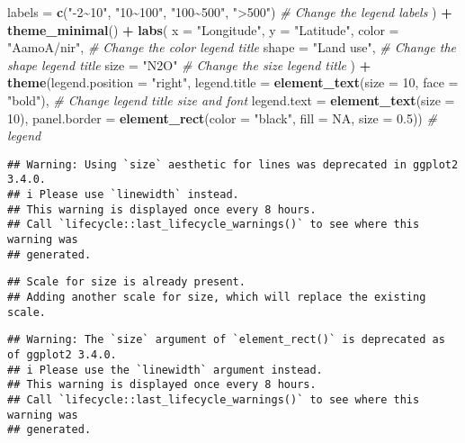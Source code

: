 \documentclass[
]{article}
\newenvironment{Shaded}{\begin{snugshade}}{\end{snugshade}}
\newcommand{\AttributeTok}[1]{\textcolor[rgb]{0.13,0.29,0.53}{#1}}
\newcommand{\CommentTok}[1]{\textcolor[rgb]{0.56,0.35,0.01}{\textit{#1}}}
\newcommand{\ConstantTok}[1]{\textcolor[rgb]{0.56,0.35,0.01}{#1}}
\newcommand{\DecValTok}[1]{\textcolor[rgb]{0.00,0.00,0.81}{#1}}
\newcommand{\FloatTok}[1]{\textcolor[rgb]{0.00,0.00,0.81}{#1}}
\newcommand{\FunctionTok}[1]{\textcolor[rgb]{0.13,0.29,0.53}{\textbf{#1}}}
\newcommand{\NormalTok}[1]{#1}
\newcommand{\SpecialCharTok}[1]{\textcolor[rgb]{0.81,0.36,0.00}{\textbf{#1}}}
\newcommand{\StringTok}[1]{\textcolor[rgb]{0.31,0.60,0.02}{#1}}
\begin{document}
\begin{Shaded}
\begin{Highlighting}[]
    \AttributeTok{labels =} \FunctionTok{c}\NormalTok{(}\StringTok{"{-}2\textasciitilde{}10"}\NormalTok{, }\StringTok{"10\textasciitilde{}100"}\NormalTok{, }\StringTok{"100\textasciitilde{}500"}\NormalTok{, }\StringTok{"\textgreater{}500"}\NormalTok{)  }\CommentTok{\# Change the legend labels}
\NormalTok{  ) }\SpecialCharTok{+}
  \FunctionTok{theme\_minimal}\NormalTok{() }\SpecialCharTok{+}
  \FunctionTok{labs}\NormalTok{(}
    \AttributeTok{x =} \StringTok{"Longitude"}\NormalTok{, }\AttributeTok{y =} \StringTok{"Latitude"}\NormalTok{,}
    \AttributeTok{color =} \StringTok{"AamoA/nir"}\NormalTok{,  }\CommentTok{\# Change the color legend title}
    \AttributeTok{shape =} \StringTok{"Land use"}\NormalTok{,    }\CommentTok{\# Change the shape legend title}
    \AttributeTok{size =} \StringTok{"N2O"}           \CommentTok{\# Change the size legend title}
\NormalTok{  ) }\SpecialCharTok{+}
  \FunctionTok{theme}\NormalTok{(}\AttributeTok{legend.position =} \StringTok{"right"}\NormalTok{,}
        \AttributeTok{legend.title =} \FunctionTok{element\_text}\NormalTok{(}\AttributeTok{size =} \DecValTok{10}\NormalTok{, }\AttributeTok{face =} \StringTok{"bold"}\NormalTok{),  }\CommentTok{\# Change legend title size and font}
        \AttributeTok{legend.text =} \FunctionTok{element\_text}\NormalTok{(}\AttributeTok{size =} \DecValTok{10}\NormalTok{),}
        \AttributeTok{panel.border =} \FunctionTok{element\_rect}\NormalTok{(}\AttributeTok{color =} \StringTok{"black"}\NormalTok{, }\AttributeTok{fill =} \ConstantTok{NA}\NormalTok{, }\AttributeTok{size =} \FloatTok{0.5}\NormalTok{))  }\CommentTok{\# legend}
\end{Highlighting}
\end{Shaded}

\begin{verbatim}
## Warning: Using `size` aesthetic for lines was deprecated in ggplot2 3.4.0.
## i Please use `linewidth` instead.
## This warning is displayed once every 8 hours.
## Call `lifecycle::last_lifecycle_warnings()` to see where this warning was
## generated.
\end{verbatim}

\begin{verbatim}
## Scale for size is already present.
## Adding another scale for size, which will replace the existing scale.
\end{verbatim}

\begin{verbatim}
## Warning: The `size` argument of `element_rect()` is deprecated as of ggplot2 3.4.0.
## i Please use the `linewidth` argument instead.
## This warning is displayed once every 8 hours.
## Call `lifecycle::last_lifecycle_warnings()` to see where this warning was
## generated.
\end{verbatim}
\end{document}
